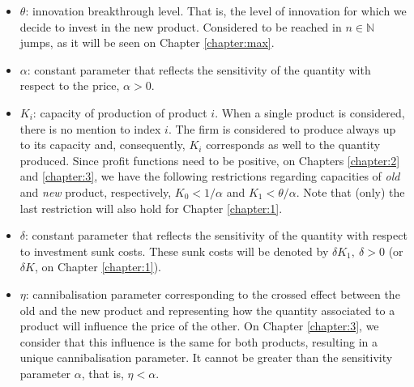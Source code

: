 \begin{itemize}
	\item $\theta$: innovation breakthrough level. That is, the level of innovation for which we decide to invest in the new product. Considered to be reached in $n \in \mathds{N}$ jumps, as it will be seen on Chapter \ref{chapter:max}.
	
	\item $\alpha$: constant parameter that reflects the sensitivity of the quantity with respect to the price, $\alpha>0$.
	
	\item $K_i$: capacity of production of product $i$. When a single product is considered, there is no mention to index $i$. The firm is considered to produce always up to its capacity and, consequently, $K_i$ corresponds as well to the quantity produced. Since profit functions need to be positive, on Chapters \ref{chapter:2} and \ref{chapter:3}, we have the following restrictions regarding capacities of \textit{old} and \textit{new} product, respectively, $K_0<1/\alpha$ and $K_1<\theta/\alpha$. Note that (only) the last restriction will also hold for Chapter \ref{chapter:1}.
	
	\item $\delta$: constant parameter that reflects the sensitivity of the quantity with respect to investment sunk costs. These sunk costs will be denoted by $\delta K_1, \  \delta>0$ (or $\delta K$, on Chapter \ref{chapter:1}).
	
	\item $\eta$: cannibalisation parameter corresponding to the crossed effect between the old and the new product and representing how the quantity associated to a product will influence the price of the other. On Chapter \ref{chapter:3}, we consider that this influence is the same for both products, resulting in a unique cannibalisation parameter. It cannot be greater than the sensitivity parameter $\alpha$, that is, $\eta <\alpha$.
\end{itemize}